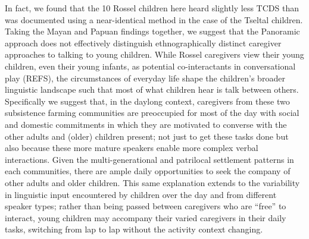 \documentclass[,man,floatsintext]{apa6}
\begin{document}
In fact, we found that the 10 Rossel children here heard slightly less
TCDS than was documented using a near-identical method in the case of
the Tseltal children. Taking the Mayan and Papuan findings together, we
suggest that the Panoramic approach does not effectively distinguish
ethnographically distinct caregiver approaches to talking to young
children. While Rossel caregivers view their young children, even their
young infants, as potential co-interactants in conversational play
(REFS), the circumstances of everyday life shape the children's broader
linguistic landscape such that most of what children hear is talk
between others. Specifically we suggest that, in the daylong context,
caregivers from these two subsistence farming communities are
preoccupied for most of the day with social and domestic commitments in
which they are motivated to converse with the other adults and (older)
children present; not just to get these tasks done but also because
these more mature speakers enable more complex verbal interactions.
Given the multi-generational and patrilocal settlement patterns in each
communities, there are ample daily opportunities to seek the company of
other adults and older children. This same explanation extends to the
variability in linguistic input encountered by children over the day and
from different speaker types; rather than being passed between
caregivers who are \enquote{free} to interact, young children may
accompany their varied caregivers in their daily tasks, switching from
lap to lap without the activity context changing.
\end{document}
